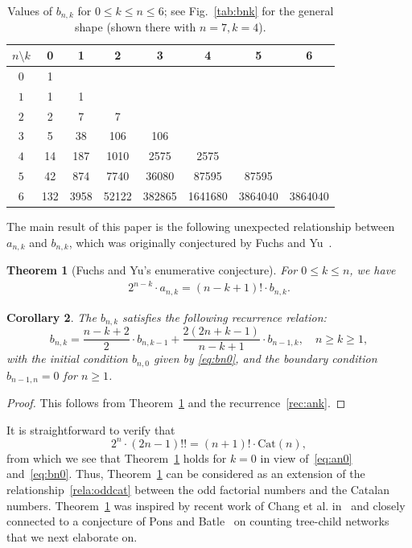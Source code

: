 \documentclass[reqno, 12pt]{article}
\newtheorem{thm}{Theorem}[section]
\newtheorem{cor}[thm]{Corollary}
\theoremstyle{mydefinition}
\theoremstyle{myremark}
\numberwithin{algorithm}{section}
\begin{document}
\begin{tiny}
\begin{table}
    	\centering
\caption{Values of $b_{n,k}$ for $0\le k\le n\le 6$; see Fig.~\ref{tab:bnk} for the general shape (shown there with $n=7,k=4$).}
    \label{tabb-Bnk}
    	\begin{tabular}{c||c|c|c|c|c|c|c }
    		\hline \hline
$n\setminus k$ & 0 & 1 & 2 & 3 & 4 & 5 & 6 \\
    		\hline
$0$ & 1 &   &   &   &   &  &  \\
    		\hline
$1$ & 1 &  1 &   &   &   &  &  \\
    		\hline
$2$ & 2 &  7 &  7 &   &   &  & \\
    		\hline
$3$ & 5 & 38  & 106  & 106  &   &  & \\
    		\hline
$4$ & 14 & 187  & 1010  & 2575  & 2575  &  &  \\
    		\hline
$5$ & 42 &  874 & 7740  &  36080 & 87595  &  87595 &  \\
    		\hline
$6$ & 132  & 3958  &  52122  &  382865 &  1641680  & 3864040 & 3864040 \\
    		\hline
    	\end{tabular}
\end{table}
\end{tiny}


The main result of this paper is the following unexpected relationship between $a_{n,k}$ and $b_{n,k}$, which was originally conjectured by Fuchs and Yu~\cite{Fang}.
\begin{thm}[Fuchs and Yu's enumerative conjecture]\label{MainConject}
For $0\leq k\leq n$, we have
\begin{align}\label{JingLiu}
2^{n-k}\cdot a_{n,k}=(n-k+1)!\cdot b_{n,k}.
\end{align}
\end{thm}

\begin{cor}\label{Canject-bnk}
The $b_{n,k}$ satisfies the following recurrence relation:
$$b_{n,k}=\frac{n-k+2}{2}\cdot b_{n,k-1}+\frac{2(2n+k-1)}{n-k+1}\cdot b_{n-1,k}, \quad n\geq k\geq 1,$$
with the initial condition $b_{n,0}$ given by \eqref{eq:bn0}, and the boundary condition $b_{n-1,n}=0$ for $n\geq 1$.
\end{cor}
\begin{proof}
This follows from Theorem~\ref{MainConject} and the recurrence~\eqref{rec:ank}.
\end{proof}

It is straightforward to verify that
\begin{equation}\label{rela:oddcat}
2^n\cdot(2n-1)!!=(n+1)!\cdot\mathrm{Cat}(n),
\end{equation}
 from which we see that Theorem~\ref{MainConject} holds for $k=0$ in view of~\eqref{eq:an0} and~\eqref{eq:bn0}.
Thus, Theorem~\ref{MainConject} can be considered as an extension of the relationship~\eqref{rela:oddcat} between the odd factorial numbers and the Catalan numbers.
Theorem~\ref{MainConject} was inspired by recent work of Chang et al. in~\cite{CFLWY} and closely connected to a  conjecture of Pons and Batle~\cite[Conjecture~1]{PB} on counting  tree-child networks that we next elaborate on.
\end{document}
